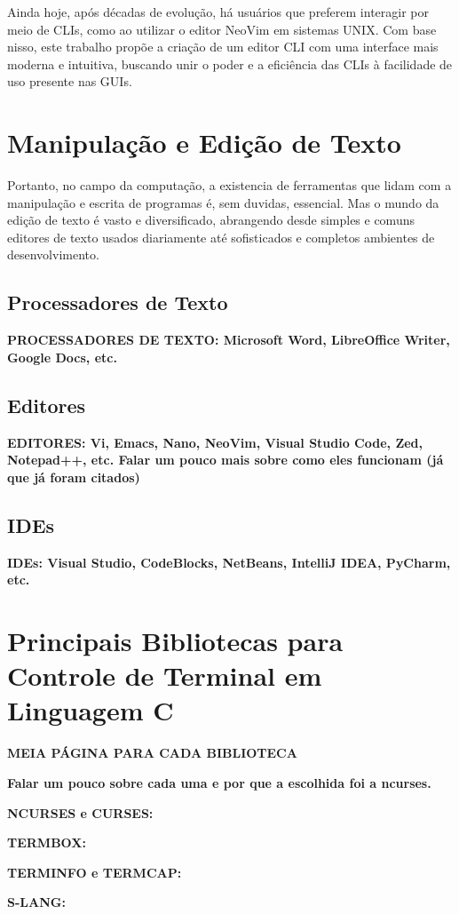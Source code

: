 Ainda hoje, após décadas de evolução, há usuários que preferem interagir por meio
de CLIs, como ao utilizar o editor NeoVim em sistemas UNIX. Com base nisso, este
trabalho propõe a criação de um editor CLI com uma interface mais moderna e
intuitiva, buscando unir o poder e a eficiência das CLIs à facilidade de uso presente
nas GUIs.

\section{Manipulação e Edição de Texto}

Portanto, no campo da computação, a existencia de ferramentas que lidam com a
manipulação e escrita de programas é, sem duvidas, essencial. Mas o mundo da edição
de texto é vasto e diversificado, abrangendo desde simples e comuns editores de
texto usados diariamente até sofisticados e completos ambientes de
desenvolvimento.

\subsection{Processadores de Texto}
\textbf{PROCESSADORES DE TEXTO: Microsoft Word, LibreOffice Writer, Google Docs,
etc.}

\subsection{Editores}

\textbf{EDITORES: Vi, Emacs, Nano, NeoVim, Visual Studio Code, Zed, Notepad++,
etc. Falar um pouco mais sobre como eles funcionam (já que já foram citados)}

\subsection{IDEs}

\textbf{IDEs: Visual Studio, CodeBlocks, NetBeans, IntelliJ IDEA, PyCharm, etc.}

\section{Principais Bibliotecas para Controle de Terminal em Linguagem C}

\textbf{MEIA PÁGINA PARA CADA BIBLIOTECA}

\textbf{Falar um pouco sobre cada uma e por que a escolhida foi a ncurses.}

\textbf{NCURSES e CURSES:}

\textbf{TERMBOX:}

\textbf{TERMINFO e TERMCAP:}

\textbf{S-LANG:}
